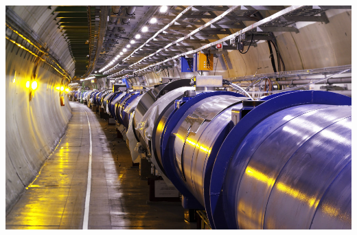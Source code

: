 \documentclass{beamer}
\begin{document}
\begin{frame}
{\begin{columns}
\begin{column}{0.4\textwidth}
            \includegraphics[width=\textwidth]{figures/lhc2.jpg}\\
        \end{column}
    \end{columns}
    }
\end{frame}
\end{document}
